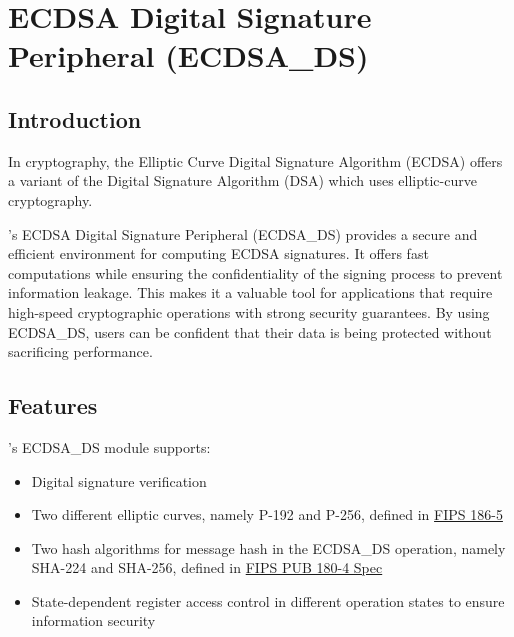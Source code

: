 \documentclass[main\_\_EN.tex]{subfiles}
\begin{document}

\ifglobal
\else
    {\let\clearpage\relax \listoftodos}
    {\let\clearpage\relax \listofdonetodos}
    \tableofcontents
\fi




\hypertarget{ecdsa}{}
\chapter{ECDSA Digital Signature Peripheral (ECDSA\_DS)}
\label{mod:ecdsa}



\section{Introduction}

In cryptography, the Elliptic Curve Digital Signature Algorithm (ECDSA) offers a variant of the Digital Signature Algorithm (DSA) which uses elliptic-curve cryptography.

\chipname{}'s ECDSA Digital Signature Peripheral (ECDSA\_DS) provides a secure and efficient environment for computing ECDSA signatures. It offers fast computations while ensuring the confidentiality of the signing process to prevent information leakage. This makes it a valuable tool for applications that require high-speed cryptographic operations with strong security guarantees. By using ECDSA\_DS, users can be confident that their data is being protected without sacrificing performance.


\section{Features}
\label{sec:ecdsa-features}

\chipname{}'s ECDSA\_DS module supports:

\begin{itemize}
    \item Digital signature verification
    \item Two different elliptic curves, namely P-192 and P-256, defined in \href{https://nvlpubs.nist.gov/nistpubs/FIPS/NIST.FIPS.186-5.pdf}{FIPS 186-5}
    \item Two hash algorithms for message hash in the ECDSA\_DS operation, namely SHA-224 and SHA-256, defined in \href{https://doi.org/10.6028/NIST.FIPS.180-4}{FIPS PUB 180-4 Spec}
    \item State-dependent register access control in different operation states to ensure information security
\end{itemize}
\end{document}
